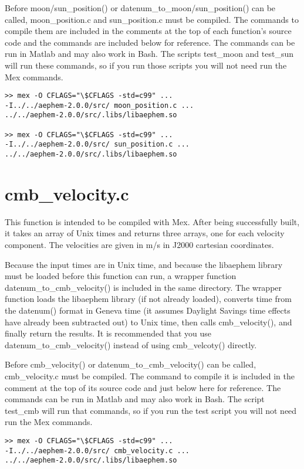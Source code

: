 \documentclass[12pt]{report}
\begin{document}
Before moon/sun\_position() or datenum\_to\_moon/sun\_position() can be called, moon\_position.c and sun\_position.c must be compiled.  The commands to compile them are included in the comments at the top of each function's source code and the commands are included below for reference.  The commands can be run in Matlab and may also work in Bash.  The scripts test\_moon and test\_sun will run these commands, so if you run those scripts you will not need run the Mex commands.

\begin{verbatim}
>> mex -O CFLAGS="\$CFLAGS -std=c99" ...
-I../../aephem-2.0.0/src/ moon_position.c ...
../../aephem-2.0.0/src/.libs/libaephem.so

>> mex -O CFLAGS="\$CFLAGS -std=c99" ...
-I../../aephem-2.0.0/src/ sun_position.c ...
../../aephem-2.0.0/src/.libs/libaephem.so
\end{verbatim}

\section{cmb\_velocity.c}
This function is intended to be compiled with Mex.  After being successfully built, it takes an array of Unix times and returns three arrays, one for each velocity component.  The velocities are given in m/s in J2000 cartesian coordinates.

Because the input times are in Unix time, and because the libaephem library must be loaded before this function can run, a wrapper function datenum\_to\_cmb\_velocity() is included in the same directory.  The wrapper function loads the libaephem library (if not already loaded), converts time from the datenum() format in Geneva time (it assumes Daylight Savings time effects have already been subtracted out) to Unix time, then calls cmb\_velocity(), and finally return the results.  It is recommended that you use datenum\_to\_cmb\_velocity() instead of using cmb\_velcoty() directly.

Before cmb\_velocity() or datenum\_to\_cmb\_velocity() can be called, cmb\_velocity.c must be compiled.  The command to compile it is included in the comment at the top of its source code and just below here for reference.  The commands can be run in Matlab and may also work in Bash.  The script test\_cmb will run that commands, so if you run the test script you will not need run the Mex commands.

\begin{verbatim}
>> mex -O CFLAGS="\$CFLAGS -std=c99" ...
-I../../aephem-2.0.0/src/ cmb_velocity.c ...
../../aephem-2.0.0/src/.libs/libaephem.so
\end{verbatim}
\end{document}
